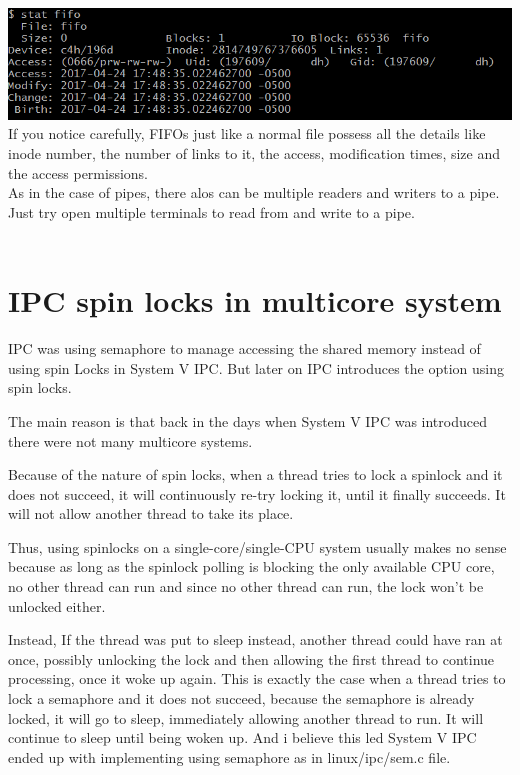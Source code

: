 \documentclass[10pt,preprint]{sigplanconf}
\begin{document}
\includegraphics[totalheight=18mm]{fig3.png}\\
If you notice carefully, FIFOs just like a normal file possess all the details like inode number, the number of links to it, the access, modification times, size and the access permissions.\\
As in the case of pipes, there alos can be multiple readers and writers to a pipe. Just try open multiple terminals to read from and write to a pipe.\\\\

\section{IPC spin locks in multicore system}

IPC was using semaphore to manage accessing the shared memory instead of using spin  
Locks in System V IPC. But later on IPC introduces the option using spin locks.

The main reason is that back in the days when System V IPC was introduced there were not many multicore systems. 

Because of the nature of spin locks, when a thread tries to lock a spinlock and it does not succeed, it will continuously re-try locking it, until it finally succeeds. It will not allow another thread to take its place.

Thus, using spinlocks on a single-core/single-CPU system usually makes no sense because as long as the spinlock polling is blocking the only available CPU core, no other thread can run and since no other thread can run, the lock won't be unlocked either. 

Instead, If the thread was put to sleep instead, another thread could have ran at once, possibly unlocking the lock and then allowing the first thread to continue processing, once it woke up again. This is exactly the case when a thread tries to lock a semaphore and it does not succeed, because the semaphore is already locked, it will go to sleep, immediately allowing another thread to run. It will continue to sleep until being woken up. And i believe this led System V IPC ended up with implementing using semaphore as in linux/ipc/sem.c file. 
\end{document}
